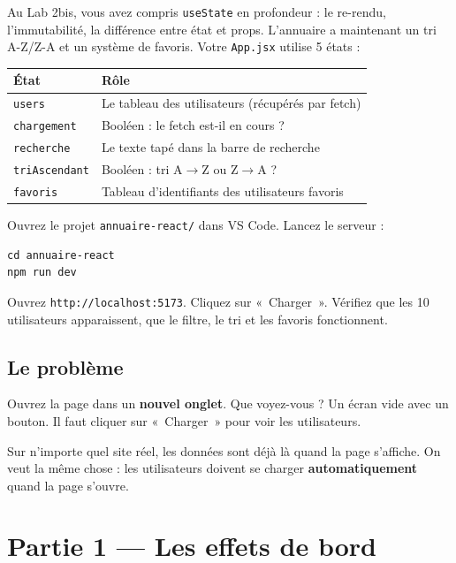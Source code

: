 \documentclass[11pt,a4paper]{article}
\begin{document}
Au Lab 2bis, vous avez compris \texttt{useState} en profondeur : le re-rendu, l'immutabilité, la différence entre état et props. L'annuaire a maintenant un tri A-Z/Z-A et un système de favoris. Votre \texttt{App.jsx} utilise 5 états :

\begin{center}
\begin{tabular}{lp{8cm}}
\toprule
\textbf{État} & \textbf{Rôle} \\
\midrule
\texttt{users} & Le tableau des utilisateurs (récupérés par fetch) \\
\texttt{chargement} & Booléen : le fetch est-il en cours ? \\
\texttt{recherche} & Le texte tapé dans la barre de recherche \\
\texttt{triAscendant} & Booléen : tri A$\to$Z ou Z$\to$A ? \\
\texttt{favoris} & Tableau d'identifiants des utilisateurs favoris \\
\bottomrule
\end{tabular}
\end{center}

\begin{objectifbox}
Ouvrez le projet \texttt{annuaire-react/} dans VS Code. Lancez le serveur :
\begin{lstlisting}[style=terminal]
cd annuaire-react
npm run dev
\end{lstlisting}
Ouvrez \texttt{http://localhost:5173}. Cliquez sur «~Charger~». Vérifiez que les 10 utilisateurs apparaissent, que le filtre, le tri et les favoris fonctionnent.
\end{objectifbox}

\subsection{Le problème}

Ouvrez la page dans un \textbf{nouvel onglet}. Que voyez-vous ? Un écran vide avec un bouton. Il faut cliquer sur «~Charger~» pour voir les utilisateurs.

Sur n'importe quel site réel, les données sont déjà là quand la page s'affiche. On veut la même chose : les utilisateurs doivent se charger \textbf{automatiquement} quand la page s'ouvre.

\section{Partie 1 --- Les effets de bord}
\end{document}
